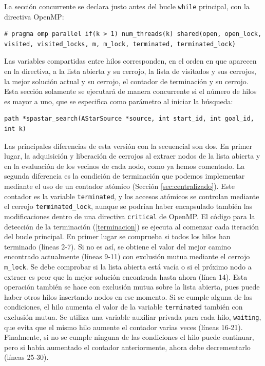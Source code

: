 \documentclass[a4paper,12pt]{article}
\begin{document}
La sección concurrente se declara justo antes del bucle \verb|while| principal, con la directiva OpenMP:

\begin{lstlisting}
# pragma omp parallel if(k > 1) num_threads(k) shared(open, open_lock, visited, visited_locks, m, m_lock, terminated, terminated_lock)
\end{lstlisting}

Las variables compartidas entre hilos corresponden, en el orden en que aparecen en la directiva, a la lista abierta y su cerrojo, la lista de visitados y sus cerrojos, la mejor solución actual y su cerrojo, el contador de terminación y su cerrojo. Esta sección solamente se ejecutará de manera concurrente si el número de hilos es mayor a uno, que se especifica como parámetro al iniciar la búsqueda:

\begin{lstlisting}
path *spastar_search(AStarSource *source, int start_id, int goal_id, int k)
\end{lstlisting}

Las principales diferencias de esta versión con la secuencial son dos. En primer lugar, la adquisición y liberación de cerrojos al extraer nodos de la lista abierta y en la evaluación de los vecinos de cada nodo, como ya hemos comentado. La segunda diferencia es la condición de terminación que podemos implementar mediante el uso de un contador atómico (Sección \ref{sec:centralizado}). Este contador es la variable \verb|terminated|, y los accesos atómicos se controlan mediante el cerrojo \verb|terminated_lock|, aunque se podrían haber encapsulado también las modificaciones dentro de una directiva \verb|critical| de OpenMP. El código para la detección de la terminación (\ref{terminacion}) se ejecuta al comenzar cada iteración del bucle principal. En primer lugar se comprueba si todos los hilos han terminado (líneas 2-7). Si no es así, se obtiene el valor del mejor camino encontrado actualmente (líneas 9-11) con exclusión mutua mediante el cerrojo \verb|m_lock|. Se debe comprobar si la lista abierta está vacía o si el próximo nodo a extraer es peor que la mejor solución encontrada hasta ahora (línea 14). Esta operación también se hace con exclusión mutua sobre la lista abierta, pues puede haber otros hilos insertando nodos en ese momento. Si se cumple alguna de las condiciones, el hilo aumenta el valor de la variable \verb|terminated| también con exclusión mutua. Se utiliza una variable auxiliar privada para cada hilo, \verb|waiting|, que evita que el mismo hilo aumente el contador varias veces (líneas 16-21). Finalmente, si no se cumple ninguna de las condiciones el hilo puede continuar, pero si había aumentado el contador anteriormente, ahora debe decrementarlo (líneas 25-30).
\end{document}
